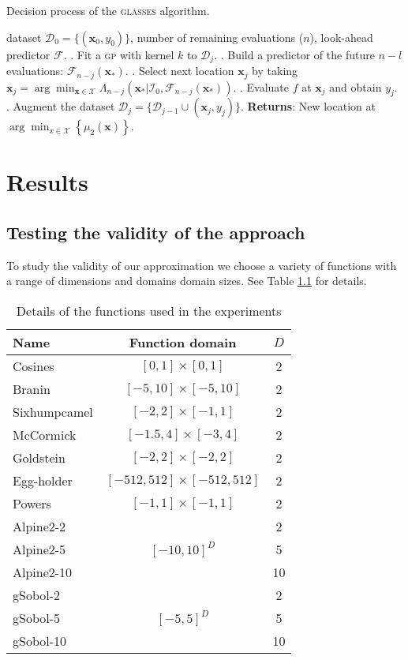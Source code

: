\documentclass[twoside]{article}
\newcommand{\I}{\mathcal{I}}
\newcommand{\bx}{\textbf{x}}
\newcommand{\future}{\mathcal{F}}
\newcommand{\acr}[1]{\textsc{#1}\xspace}
\newcommand{\gp}{\acr{gp}}
\newcommand{\us}{\acr{glasses}}
\begin{document}
\begin{algorithm*}[t!]
   \caption{Decision process of the \us algorithm.}
   \label{alg:glasses}
\begin{algorithmic}
    dataset $\mathcal{D}_{0} = \{(\textbf{x}_0, y_0)\}$, number of remaining evaluations ($n$), look-ahead predictor $\future$.
   . Fit a \gp with kernel $k$ to $\mathcal{D}_{j}$.
   . Build a predictor of the future $n-l$ evaluations: $\future_{n-j}(\bx_*)$.
   . Select next location $\bx_j$ by taking  $\bx_j = \arg \min_{\bx \in {\mathcal X}}\Lambda_{n-j}(\bx_*|\I_0, \future_{n-j}(\bx_*))$.
   . Evaluate $f$ at $\bx_j$ and obtain $y_j$.
   . Augment the dataset $\mathcal{D}_{j} = \{\mathcal{D}_{j-1} \cup (\textbf{x}_j, y_j)\}$.
   \ENDFOR
   \STATE \textbf{Returns}: New location at $\arg \min_{x \in \mathcal{X}} \left\{\mu_2(\bx)\right\}$.  
\end{algorithmic}
\end{algorithm*}

\section{Results}\label{sec:experiments}


\subsection{Testing the validity of the approach}
To study the validity of our approximation we choose a variety of functions with a range  of dimensions and domains domain sizes. See Table \ref{} for details.

\begin{table}[t!]
\begin{center}
\begin{tabular}{lcc}
\toprule
Name &Function domain & $D$ \\
\midrule
\hline
Cosines & $[0,1]\times[0,1]$ & 2\\
Branin &$[-5,10]\times[-5,10]$ & 2\\
 Sixhumpcamel  &$[-2,2]\times[-1,1]$ & 2\\
McCormick  & $[-1.5,4]\times[-3,4]$& 2\\
Goldstein &$[-2,2]\times[-2,2]$& 2\\
Egg-holder   &$[-512,512]\times[-512,512]$ & 2\\
Powers  & $[-1,1]\times[-1,1]$& 2\\ \hline
Alpine2-2  &  & 2\\
Alpine2-5  & $[-10,10]^{D}$& 5\\
Alpine2-10  & & 10\\\hline
gSobol-2  & & 2\\
gSobol-5  &$[-5,5]^{D}$ & 5\\
gSobol-10  & & 10\\
\bottomrule
\end{tabular}\caption{Details of the functions used in the experiments}
\end{center}
\end{table}
\end{document}
